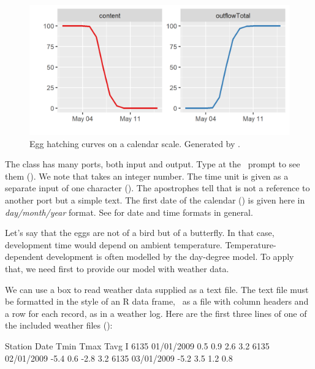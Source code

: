 \begin{figure}
\centering
\includegraphics{graphics/egg3}
\caption{Egg hatching curves on a calendar scale. Generated by .}
\label{fig:egg3}
\end{figure}

The  class has many ports, both input and output. Type  at the \US\ prompt to see them (). We note that  takes an integer number. The time unit is given as a separate input of one character (). The apostrophes tell that  is not a  reference to another port but a simple text. The first date of the calendar () is given here in \textit{day/month/year} format. See  for date and time formats in general.

Let's say that the eggs are not of a bird but of a butterfly. In that case, development time would depend on ambient temperature. Temperature-dependent development is often modelled by the day-degree model. To apply that, we need first to provide our model with weather data.

We can use a  box to read weather data supplied as a text file. The text file must be formatted in the style of an R data frame, \ie\ as a file with column headers and a row for each record, as in a weather log. Here are the first three lines of one of the included weather files ():

\lstset{tabsize=8}
\begin{boxscript}
Station  Date    Tmin  Tmax  Tavg  I
6135  01/01/2009  0.5  0.9  2.6  3.2
6135  02/01/2009  -5.4  0.6  -2.8  3.2
6135  03/01/2009  -5.2  3.5  1.2  0.8
\end{boxscript}
\lstset{tabsize=2}

